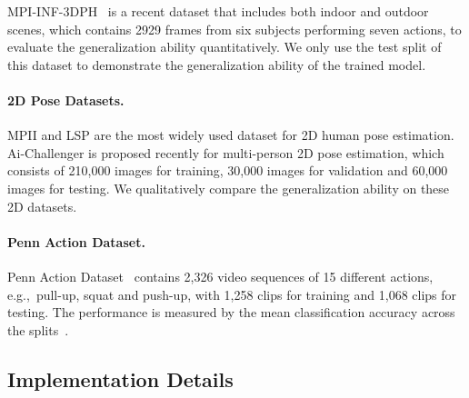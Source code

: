 \documentclass[10pt,twocolumn,letterpaper]{article}
\def\eg{e.g.,~}
\begin{document}
MPI-INF-3DPH~\cite{mehta2017monocular} is a recent dataset that includes both indoor and outdoor scenes, which contains 2929 frames from six subjects performing seven actions, to evaluate the generalization ability quantitatively.
We only use the test split of this dataset to demonstrate the generalization ability of the trained model.
\paragraph{2D Pose Datasets.}\vspace{-5mm}
MPII and LSP are the most widely used dataset for 2D human pose estimation.
Ai-Challenger is proposed recently for multi-person 2D pose estimation, which consists of 210,000 images for training, 30,000 images for validation and 60,000 images for testing.
We qualitatively compare the generalization ability on these 2D datasets.
\paragraph{Penn Action Dataset.}\vspace{-5mm}
Penn Action Dataset~\cite{zhang2013actemes} contains 2,326 video sequences of 15 different actions, \eg{pull-up, squat and push-up}, with 1,258 clips for training and 1,068 clips for testing. 
The performance is measured by the mean classification accuracy across the splits~\cite{simonyan2014two}.
\subsection{Implementation Details}
\end{document}
